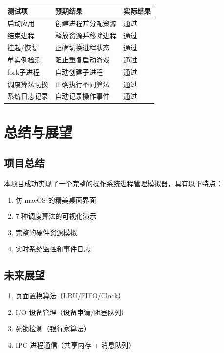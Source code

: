 \documentclass[12pt,a4paper]{article}
\begin{document}
\begin{table}[H]
\centering
\begin{tabular}{lll}
\toprule
\textbf{测试项} & \textbf{预期结果} & \textbf{实际结果} \\
\midrule
启动应用 & 创建进程并分配资源 & 通过 \\
结束进程 & 释放资源并移除进程 & 通过 \\
挂起/恢复 & 正确切换进程状态 & 通过 \\
单实例检测 & 阻止重复启动游戏 & 通过 \\
fork子进程 & 自动创建子进程 & 通过 \\
调度算法切换 & 正确执行不同算法 & 通过 \\
系统日志记录 & 自动记录操作事件 & 通过 \\
\bottomrule
\end{tabular}
\end{table}

\section{总结与展望}

\subsection{项目总结}
本项目成功实现了一个完整的操作系统进程管理模拟器，具有以下特点：
\begin{enumerate}
    \item 仿 macOS 的精美桌面界面
    \item 7 种调度算法的可视化演示
    \item 完整的硬件资源模拟
    \item 实时系统监控和事件日志
\end{enumerate}

\subsection{未来展望}
\begin{enumerate}
    \item 页面置换算法（LRU/FIFO/Clock）
    \item I/O 设备管理（设备申请/阻塞队列）
    \item 死锁检测（银行家算法）
    \item IPC 进程通信（共享内存 + 消息队列）
\end{enumerate}
\end{document}

